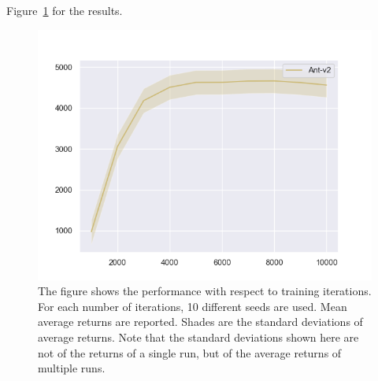 Figure~\ref{fig:1-3} for the results.

\begin{figure}[htbp]

\centering
\includegraphics[width=0.7\linewidth]{figures/figure-1-3.png}
\caption{The figure shows the performance with respect to training iterations. For each number of iterations, 10 different seeds are used. Mean average returns are reported. Shades are the standard deviations of average returns. Note that the standard deviations shown here are not of the returns of a single run, but of the average returns of multiple runs.}
\label{fig:1-3}
\end{figure}